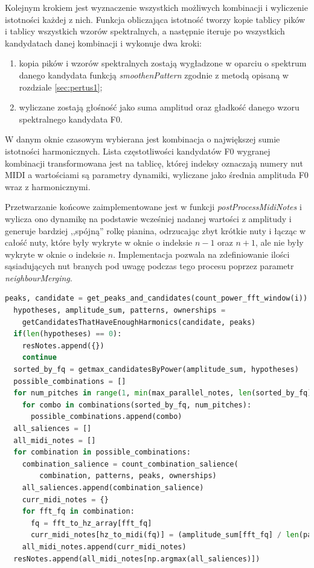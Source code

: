 \documentclass[12pt,a4paper,twoside]{mwart}
\begin{document}
Kolejnym krokiem jest wyznaczenie wszystkich możliwych kombinacji i wyliczenie istotności każdej z nich. Funkcja obliczająca istotność tworzy kopie tablicy pików i tablicy wszystkich wzorów spektralnych, a następnie iteruje po wszystkich kandydatach danej kombinacji i wykonuje dwa kroki:
\begin{enumerate}
  \item kopia pików i wzorów spektralnych zostają wygładzone w oparciu o spektrum danego kandydata funkcją \textit{smoothenPattern} zgodnie z metodą opisaną w rozdziale \ref{sec:pertus1};
  \item wyliczane zostają głośność jako suma amplitud oraz gładkość danego wzoru spektralnego kandydata F0.
\end{enumerate}
W danym oknie czasowym wybierana jest kombinacja o największej sumie istotności harmonicznych. Lista częstotliwości kandydatów F0 wygranej kombinacji transformowana jest na tablicę, której indeksy oznaczają numery nut MIDI a wartościami są parametry dynamiki, wyliczane jako średnia amplituda F0 wraz z harmonicznymi.

Przetwarzanie końcowe zaimplementowane jest w funkcji \textit{postProcessMidiNotes} i wylicza ono dynamikę na podstawie wcześniej nadanej wartości z amplitudy i generuje bardziej ,,spójną'' rolkę pianina, odrzucając zbyt krótkie nuty i łącząc w całość nuty, które były wykryte w oknie o indeksie $n-1$ oraz $n+1$, ale nie były wykryte w oknie o indeksie $n$. Implementacja pozwala na zdefiniowanie ilości sąsiadujących nut branych pod uwagę podczas tego procesu poprzez parametr \textit{neighbourMerging}.

\begin{lstlisting}[language=Python, caption={Trzon algorytmu Pertusa i Iñesta (2008)}, captionpos=b, label={code:coreMethodPetrusa1}, numbers=none]
  peaks, candidate = get_peaks_and_candidates(count_power_fft_window(i))
  hypotheses, amplitude_sum, patterns, ownerships =
    getCandidatesThatHaveEnoughHarmonics(candidate, peaks)
  if(len(hypotheses) == 0):
    resNotes.append({})
    continue
  sorted_by_fq = getmax_candidatesByPower(amplitude_sum, hypotheses)
  possible_combinations = []
  for num_pitches in range(1, min(max_parallel_notes, len(sorted_by_fq)) + 1):
    for combo in combinations(sorted_by_fq, num_pitches):
      possible_combinations.append(combo)
  all_saliences = []
  all_midi_notes = []
  for combination in possible_combinations:
    combination_salience = count_combination_salience(
        combination, patterns, peaks, ownerships)
    all_saliences.append(combination_salience)
    curr_midi_notes = {}
    for fft_fq in combination:
      fq = fft_to_hz_array[fft_fq]
      curr_midi_notes[hz_to_midi(fq)] = (amplitude_sum[fft_fq] / len(patterns[fft_fq]))
    all_midi_notes.append(curr_midi_notes)
  resNotes.append(all_midi_notes[np.argmax(all_saliences)])
\end{lstlisting}
\end{document}
